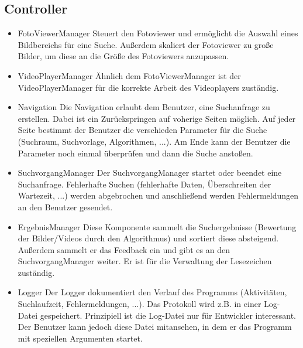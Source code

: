 \subsection{Controller}
\begin{itemize}
\item FotoViewerManager \newline
Steuert den Fotoviewer und ermöglicht die Auswahl eines Bildbereichs für eine Suche. Außerdem skaliert der Fotoviewer zu große Bilder, um diese an die Größe des Fotoviewers anzupassen.

\item VideoPlayerManager \newline
Ähnlich dem FotoViewerManager ist der VideoPlayerManager für die korrekte Arbeit des Videoplayers zuständig.

\item Navigation \newline
Die Navigation erlaubt dem Benutzer, eine Suchanfrage zu erstellen. Dabei ist ein Zurückspringen auf voherige Seiten möglich. Auf jeder Seite bestimmt der Benutzer die verschieden Parameter für die Suche (Suchraum, Suchvorlage, Algorithmen, ...). Am Ende kann der Benutzer die Parameter noch einmal überprüfen und dann die Suche anstoßen.

\item SuchvorgangManager \newline
Der SuchvorgangManager startet oder beendet eine Suchanfrage. Fehlerhafte Suchen (fehlerhafte Daten, Überschreiten der Wartezeit, ...) werden abgebrochen und anschließend werden Fehlermeldungen an den Benutzer gesendet.

\item ErgebnisManager \newline
Diese Komponente sammelt die Suchergebnisse (Bewertung der Bilder/Videos durch den Algorithmus) und sortiert diese absteigend. Außerdem sammelt er das Feedback ein und gibt es an den SuchvorgangManager weiter. Er ist für die Verwaltung der Lesezeichen zuständig.

\item Logger \newline
Der Logger dokumentiert den Verlauf des Programms (Aktivitäten, Suchlaufzeit, Fehlermeldungen, ...). Das Protokoll wird z.B. in einer Log-Datei gespeichert. Prinzipiell ist die Log-Datei nur für Entwickler interessant. Der Benutzer kann jedoch diese Datei mitansehen, in dem er das Programm mit speziellen Argumenten startet.
\end{itemize}
\pagebreak

